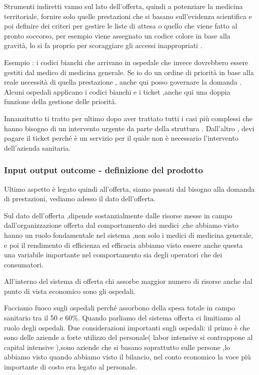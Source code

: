 Strumenti indiretti vanno sul lato dell'offerta, quindi a potenziare la
medicina territoriale, fornire solo quelle prestazioni che si basano
sull'evidenza scientifica e poi definire dei criteri per gestire le
liste di attesa o quello che viene fatto al pronto soccorso, per esempio
viene assegnato un codice colore in base alla gravità, lo si fa proprio
per scoraggiare gli accessi inappropriati .

Esempio : i codici bianchi che arrivano in ospedale che invece
dovrebbero essere gestiti dal medico di medicina generale. Se io do un
ordine di priorità in base alla reale necessità di quella prestazione ,
anche qui posso governare la domanda . Alcuni ospedali applicano i
codici bianchi e i ticket ,anche qui una doppia funzione della gestione
delle priorità.

Innanzitutto ti tratto per ultimo dopo aver trattato tutti i casi più
complessi che hanno bisogno di un intervento urgente da parte della
struttura . Dall'altro , devi pagare il ticket perché è un servizio per
il quale non è necessario l'intervento dell'azienda sanitaria.

\subsubsection{Input output outcome - definizione del prodotto}

Ultimo aspetto è legato quindi all'offerta, siamo passati dal bisogno
alla domanda di prestazioni, vediamo adesso il dato dell'offerta.

Sul dato dell'offerta ,dipende sostanzialmente dalle risorse messe in
campo dall'organizzazione offerta dal comportamento dei medici ,che
abbiamo visto hanno un ruolo fondamentale nel sistema ,non solo i medici
di medicina generale, e poi il rendimento di efficienza ed efficacia
abbiamo visto essere anche questa una variabile importante nel
comportamento sia degli operatori che dei consumatori.

All'interno del sistema di offerta chi assorbe maggior numero di risorse
anche dal punto di vista economico sono gli ospedali.

Facciamo fuoco sugli ospedali perché assorbono della spesa totale in
campo sanitario tra il 50 e 60\%. Quando parliamo del sistema offerta ci
limitiamo al ruolo degli ospedali. Due considerazioni importanti sugli
ospedali: il primo è che sono delle aziende a forte utilizzo del
personale( labor intensive si contrappone al capital intensive ),sono
aziende che si basano soprattutto sulle persone ,lo abbiamo visto quando
abbiamo visto il bilancio, nel conto economico la voce più importante di
costo era legato al personale.

